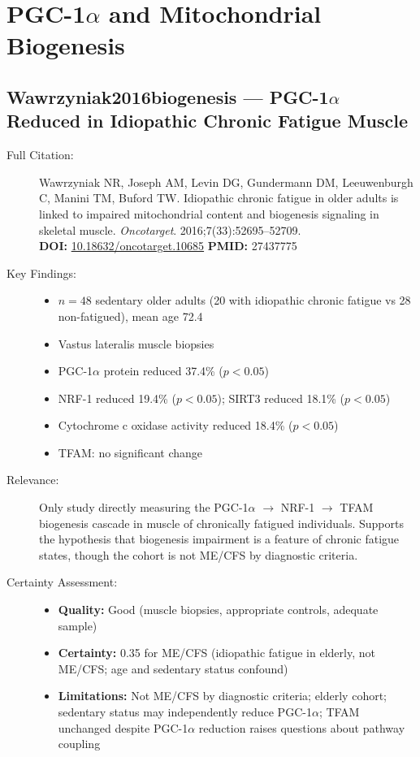 \section{PGC-1\texorpdfstring{$\alpha$}{alpha} and Mitochondrial Biogenesis}

\subsection*{Wawrzyniak2016biogenesis --- PGC-1\texorpdfstring{$\alpha$}{alpha} Reduced in Idiopathic Chronic Fatigue Muscle}
\begin{description}
    \item[Full Citation:] Wawrzyniak NR, Joseph AM, Levin DG, Gundermann DM, Leeuwenburgh C, Manini TM, Buford TW. Idiopathic chronic fatigue in older adults is linked to impaired mitochondrial content and biogenesis signaling in skeletal muscle. \textit{Oncotarget}. 2016;7(33):52695--52709.\\
    \textbf{DOI:} \href{https://doi.org/10.18632/oncotarget.10685}{10.18632/oncotarget.10685} \quad \textbf{PMID:} 27437775
    \item[Key Findings:]
    \begin{itemize}
        \item $n = 48$ sedentary older adults (20 with idiopathic chronic fatigue vs 28 non-fatigued), mean age 72.4
        \item Vastus lateralis muscle biopsies
        \item PGC-1$\alpha$ protein reduced 37.4\% ($p < 0.05$)
        \item NRF-1 reduced 19.4\% ($p < 0.05$); SIRT3 reduced 18.1\% ($p < 0.05$)
        \item Cytochrome c oxidase activity reduced 18.4\% ($p < 0.05$)
        \item TFAM: no significant change
    \end{itemize}
    \item[Relevance:] Only study directly measuring the PGC-1$\alpha$ $\to$ NRF-1 $\to$ TFAM biogenesis cascade in muscle of chronically fatigued individuals. Supports the hypothesis that biogenesis impairment is a feature of chronic fatigue states, though the cohort is not ME/CFS by diagnostic criteria.
    \item[Certainty Assessment:]
    \begin{itemize}
        \item \textbf{Quality:} Good (muscle biopsies, appropriate controls, adequate sample)
        \item \textbf{Certainty:} 0.35 for ME/CFS (idiopathic fatigue in elderly, not ME/CFS; age and sedentary status confound)
        \item \textbf{Limitations:} Not ME/CFS by diagnostic criteria; elderly cohort; sedentary status may independently reduce PGC-1$\alpha$; TFAM unchanged despite PGC-1$\alpha$ reduction raises questions about pathway coupling
    \end{itemize}
\end{description}

